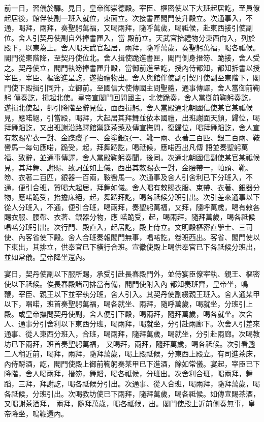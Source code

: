 \begin{pinyinscope}
 前一日，習儀於驛。見日，皇帝御崇德殿。宰臣、樞密使以下大班起居訖，至員僚起居後，館伴使副一班入就位，東面立。次接書匣閣門使升殿立。次通事入，不通，喝拜，兩拜，奏聖躬萬福，又喝兩拜，隨呼萬歲，喝祗候，赴東西接引使副位。舍人引契丹使副自外捧書匣入，當
 殿前立。天武官抬禮物分東西向入，列於殿下，以東為上。舍人喝天武官起居，兩拜，隨呼萬歲，奏聖躬萬福，喝各祗候。閣門從東階降，至契丹使位北。舍人揖使跪進書匣，閣門側身搢笏、跪接，舍人受之。契丹使立，閣門執笏捧書匣升殿，當御前進呈訖，授內侍都知，都知拆書以授宰臣，宰臣、樞密進呈訖，遂抬禮物出。舍人與館伴使副引契丹使副至東階下，閣門使下殿揖引同升，立御前。至國信大使傳國主問聖體，通事傳譯，舍人當御前鞠躬
 傳奏訖，揖起北使。皇帝宣閣門回問國主，北使跪奏，舍人當御前鞠躬奏訖，遂揖北使起，卻引降階至辭見位，面西揖躬。舍人當殿通北朝國信使某官某祗候見，應喏絕，引當殿，喝拜，大起居其拜舞並依本國禮，出班謝面天顏，歸位，喝拜舞蹈訖，又出班謝沿路驛館禦筵茶藥及傳宣撫問，復歸位，喝拜舞蹈訖，舍人宣有敕賜窄衣一對、金蹀躞子一、金塗銀冠一、靴一兩、衣著三百匹、銀二百兩、鞍轡馬一每句應喏，跪受，起，拜舞蹈訖，喝祗候，應喏西出凡傳
 語並奏聖躬萬福、致辭，並通事傳譯，舍人當殿鞠躬奏聞，後同。次通北朝國信副使某官某祗候見，其拜舞、謝賜、致詞並如上儀，西出其敕賜衣一對，金腰帶一，帕頭、靴、笏、衣著二百匹，銀器一百兩，鞍轡馬一。次通事及舍人引舍利已下分班入，不通，便引合班，贊喝大起居，拜舞如儀。舍人喝有敕賜衣服、束帶、衣著、銀器分物，應喏跪受，抬擔床絕，起，舞蹈拜訖，喝各祗候分班引出。次引差來通事以下從人分班入，不通，便引合班，喝兩拜，奏聖躬萬福，又拜，隨呼萬歲，喝有敕各賜衣服、腰帶、衣著、銀器分物，應
 喏跪受，起，喝兩拜，隨拜萬歲，喝各祗候唱喏分班引出。次行門、殿直入，起居訖，殿上侍立。文明殿樞密直學士、三司使、內客省使下殿。舍人合班奏報閣門無事，唱喏訖，卷班西出。客省、閣門使以下東出，其排立，供奉官已下橫行合班。宣徽使殿上喝供奉官已下各祗候分班出，並如常儀。皇帝降坐還內。



 宴日，契丹使副以下服所賜，承受引赴長春殿門外，並侍宴臣僚宰執、親王、樞密使以下祗候。俟長春殿諸司排當有備，閣門使附入內
 都知奏班齊，皇帝坐，鳴鞭，宰臣、親王以下並宰執分班，舍人引入。其契丹使副綴親王班入。舍人通某甲以下，唱喏，班首奏聖躬萬福，喝各就坐、兩拜，隨呼萬歲，喝就坐，分班引上殿。或皇帝撫問契丹使副，舍人便引下殿，喝兩拜，隨拜萬歲，喝各就坐。次舍人、通事分引舍利以下東西分班，喝兩拜，喝就坐，分引赴兩廊下。次舍人引差來通事、從人東西分班入，合班，喝兩拜，隨拜萬歲，喝就坐，分引赴兩廊。次喝教坊已下兩拜，班首奏聖躬萬福，
 又喝拜，兩拜，隨拜萬歲，喝各祗候。次引看盞二人稍近前，喝拜，兩拜，隨拜萬歲，喝上殿祗候，分東西上殿立。有司進茶床，內侍酹酒，訖，閣門使殿上御前鞠躬奏某甲已下進酒，餘如常儀。宴起，宰臣已下降階，舍人喝兩拜，搢笏，舞蹈，喝各祗候，分班出。次舍利合班，喝兩拜，舞蹈，三拜，拜謝訖，喝各祗候分引出。次通事、從人合班，喝兩拜，隨拜萬歲，喝各祗候，分班引出。次喝教坊使已下兩拜，隨拜萬歲，喝各祗候。如傳宣賜茶酒，又喝謝茶酒拜，
 兩拜，隨拜萬歲，喝各祗候，出。閣門使殿上近前側奏無事，皇帝降坐，鳴鞭還內。




\end{pinyinscope}
